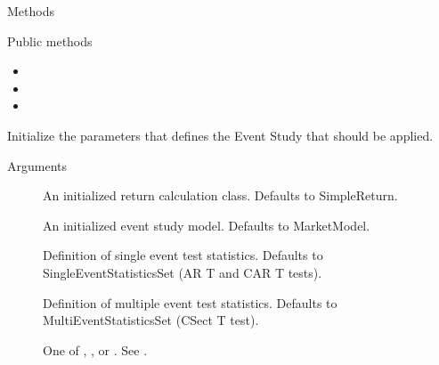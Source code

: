 \documentclass[a4paper]{book}
\begin{document}
\begin{Section}{Methods}
%
\begin{SubSection}{Public methods}
\begin{itemize}

\item{} 
\item{} 
\item{} 

\end{itemize}

\end{SubSection}



\hypertarget{method-ParameterSet-initialize}{}
%
\begin{SubSection}{}
Initialize the parameters that defines the Event Study that should be applied.
%

%
\begin{SubSubSection}{Arguments}

\begin{description}

\item[] An initialized return calculation class.
Defaults to SimpleReturn.
\item[] An initialized event study model.
Defaults to MarketModel.
\item[] Definition of single event test statistics.
Defaults to SingleEventStatisticsSet (AR T and CAR T tests).
\item[] Definition of multiple event test statistics.
Defaults to MultiEventStatisticsSet (CSect T test).
\item[] One of , ,
or . See .


\end{description}
\end{SubSubSection}
\end{SubSection}
\end{Section}
\end{document}
